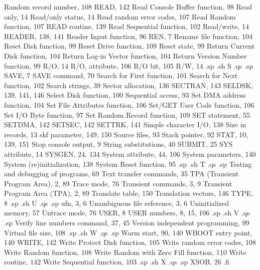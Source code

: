 Random record number, 108
READ, 142
Read Console Buffer 
    function, 98
Read only, 14
Read/only status, 14
Read random error codes, 107
Read Random function, 107
READ routine, 139
Read Sequential function, 102
Read/write, 14
READER, 138, 141
Reader Input function, 96
REN, 7
Rename file function, 104
Reset Disk function, 99
Reset Drive function, 109
Reset state, 99
Return Current Disk 
    function, 104
Return Log-in Vector 
    function, 104
Return Version Number 
    function, 99
R/O, 14
R/O, attribute, 106
R/O bit, 105
R/W, 14
.sp
.sh
S
.qs
.sp
SAVE, 7
SAVE command, 70
Search for First function, 101
Search for Next function, 102
Search strings, 39
Sector allocation, 136
SECTRAN, 143
SELDSK, 139, 141, 146
Select Disk function, 100
Sequential access, 93
Set DMA address function, 104
Set File Attributes 
    function, 106
Set/GET User Code 
    function, 106
Set I/O Byte function, 97
Set Random Record 
    function, 109
SET statement, 55
SETDMA, 142
SETSEC, 142
SETTRK, 141
Simple character I/O, 138
Size in records, 13
skf parameter, 149, 150
Source files, 93
Stack pointer, 92
STAT, 10, 139, 151
Stop console output, 9
String substitutions, 40
SUBMIT, 25
SYS attribute, 14
SYSGEN, 24, 134
System attribute, 44, 106
System parameters, 140
System (re)initialization, 138
System Reset function, 95
.sp
.sh
T
.qs
.sp
Testing and debugging of 
    programs, 69
Text transfer commands, 35
TPA (Transient Program Area), 
    2, 89
Trace mode, 76
Transient commands, 3, 9
Transient Program Area 
    (TPA), 2, 89
Translate table, 150
Translation vectors, 146
TYPE, 8
.sp
.sh
U
.qs
.sp
ufn, 3, 6
Unambiguous file reference, 
    3, 6
Uninitialized memory, 57
Untrace mode, 76
USER, 8
USER numbers, 8, 15, 106
.sp
.sh
V
.qs
.sp
Verify line numbers command, 
    37, 45
Version independent 
    programming, 99
Virtual file size, 108
.sp
.sh
W
.qs
.sp
Warm start, 90, 140
WBOOT entry point, 140
WRITE, 142
Write Protect Disk 
    function, 105
Write random error codes, 108
Write Random function, 108
Write Random with Zero Fill 
    function, 110
Write routine, 142
Write Sequential function, 103
.sp
.sh
X
.qs
.sp
XSOB, 26
.fi


